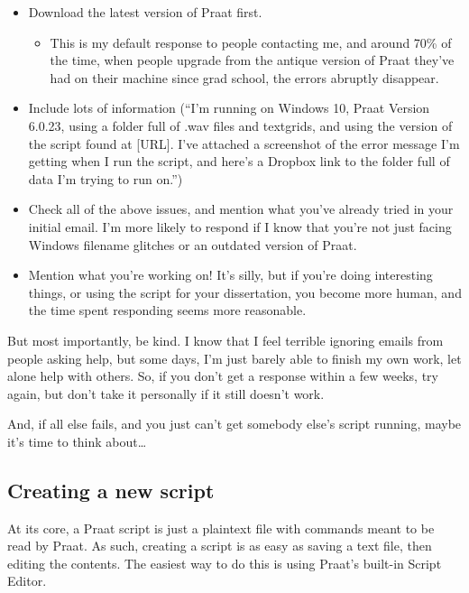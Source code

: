 \documentclass[11pt]{article}
\def\tightlist{}
\begin{document}
\begin{itemize}
\tightlist
\item
  Download the latest version of Praat first.

  \begin{itemize}
  \tightlist
  \item
    This is my default response to people contacting me, and around 70\%
    of the time, when people upgrade from the antique version of Praat
    they've had on their machine since grad school, the errors abruptly
    disappear.
  \end{itemize}
\item
  Include lots of information (``I'm running on Windows 10, Praat
  Version 6.0.23, using a folder full of .wav files and textgrids, and
  using the version of the script found at {[}URL{]}. I've attached a
  screenshot of the error message I'm getting when I run the script, and
  here's a Dropbox link to the folder full of data I'm trying to run
  on.'')
\item
  Check all of the above issues, and mention what you've already tried
  in your initial email. I'm more likely to respond if I know that
  you're not just facing Windows filename glitches or an outdated
  version of Praat.
\item
  Mention what you're working on! It's silly, but if you're doing
  interesting things, or using the script for your dissertation, you
  become more human, and the time spent responding seems more
  reasonable.
\end{itemize}

But most importantly, be kind. I know that I feel terrible ignoring
emails from people asking help, but some days, I'm just barely able to
finish my own work, let alone help with others. So, if you don't get a
response within a few weeks, try again, but don't take it personally if
it still doesn't work.

And, if all else fails, and you just can't get somebody else's script
running, maybe it's time to think about\ldots{}

\hypertarget{creating-a-new-script}{%
\subsection{Creating a new script}\label{creating-a-new-script}}

At its core, a Praat script is just a plaintext file with commands meant
to be read by Praat. As such, creating a script is as easy as saving a
text file, then editing the contents. The easiest way to do this is
using Praat's built-in Script Editor.
\end{document}
